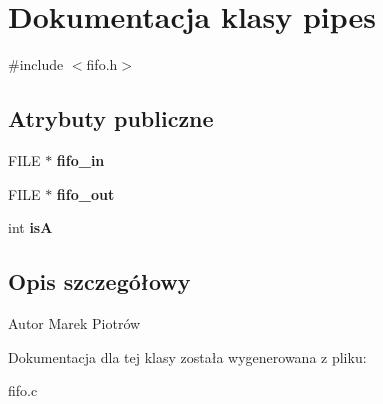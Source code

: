 \hypertarget{structpipes}{}\section{Dokumentacja klasy pipes}
\label{structpipes}


{\ttfamily \#include $<$fifo.\+h$>$}

\subsection*{Atrybuty publiczne}
\begin{DoxyCompactItemize}
\item 
F\+I\+LE $\ast$ {\bfseries fifo\+\_\+in}\hypertarget{structpipes_afa1c912838d89882e1112aa54825c95d}{}\label{structpipes_afa1c912838d89882e1112aa54825c95d}

\item 
F\+I\+LE $\ast$ {\bfseries fifo\+\_\+out}\hypertarget{structpipes_a872ae4c7721473f4d9cc5af6f6f5426a}{}\label{structpipes_a872ae4c7721473f4d9cc5af6f6f5426a}

\item 
int {\bfseries isA}\hypertarget{structpipes_ab28a99ff248f3d282ac64846cbf82d74}{}\label{structpipes_ab28a99ff248f3d282ac64846cbf82d74}

\end{DoxyCompactItemize}


\subsection{Opis szczegółowy}
\begin{DoxyAuthor}{Autor}
Marek Piotrów 
\end{DoxyAuthor}


Dokumentacja dla tej klasy została wygenerowana z pliku\+:\begin{DoxyCompactItemize}
\item 
fifo.\+c\end{DoxyCompactItemize}
